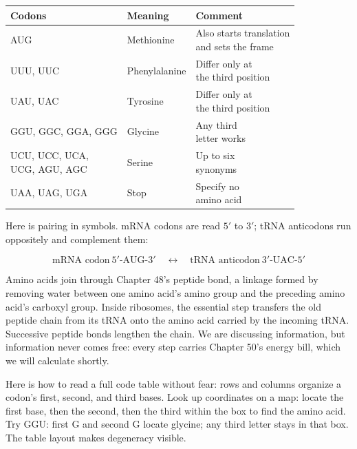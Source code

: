 \begin{table}[htbp]
\centering
\begin{tabular}{lll}
\toprule
Codons & Meaning & Comment \\
\midrule
AUG & Methionine & \shortstack[l]{Also starts translation\\and sets the frame} \\
UUU, UUC & Phenylalanine & \shortstack[l]{Differ only at\\the third position} \\
UAU, UAC & Tyrosine & \shortstack[l]{Differ only at\\the third position} \\
GGU, GGC, GGA, GGG & Glycine & \shortstack[l]{Any third\\letter works} \\
\shortstack[l]{UCU, UCC, UCA,\\UCG, AGU, AGC} & Serine & \shortstack[l]{Up to six\\synonyms} \\
UAA, UAG, UGA & Stop & \shortstack[l]{Specify no\\amino acid} \\
\bottomrule
\end{tabular}
\end{table}

Here is pairing in symbols. mRNA codons are read $5'$ to $3'$; tRNA anticodons run oppositely and complement them:

\[ \text{mRNA codon}\ 5'\text{-AUG-}3' \quad \longleftrightarrow \quad \text{tRNA anticodon}\ 3'\text{-UAC-}5' \]

Amino acids join through Chapter 48's peptide bond, a  linkage formed by removing water between one amino acid's amino group and the preceding amino acid's carboxyl group. Inside ribosomes, the essential step transfers the old peptide chain from its tRNA onto the amino acid carried by the incoming tRNA. Successive peptide bonds lengthen the chain. We are discussing information, but information never comes free: every step carries Chapter 50's energy bill, which we will calculate shortly.

Here is how to read a full code table without fear: rows and columns organize a codon's first, second, and third bases. Look up coordinates on a map: locate the first base, then the second, then the third within the box to find the amino acid. Try GGU: first G and second G locate glycine; any third letter stays in that box. The table layout makes degeneracy visible.

